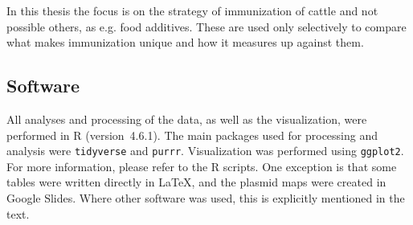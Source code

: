 In this thesis the focus is on the strategy of immunization of cattle and not possible others, as e.g. food additives. These are used only selectively to compare what makes immunization unique and how it measures up against them. 

\subsection{Software}

All analyses and processing of the data, as well as the visualization, were performed in R (version~4.6.1). The main packages used for processing and analysis were \texttt{tidyverse} and \texttt{purrr}. Visualization was performed using \texttt{ggplot2}. For more information, please refer to the R scripts. One exception is that some tables were written directly in \LaTeX{}, and the plasmid maps were created in Google Slides. Where other software was used, this is explicitly mentioned in the text.
